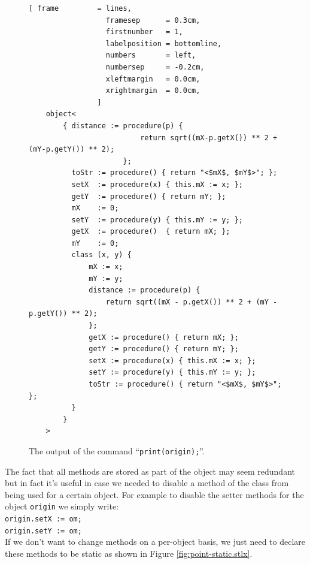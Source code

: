 \documentclass[11pt]{report}
\begin{document}
\begin{figure}[!ht]
\centering
\begin{Verbatim}[ frame         = lines, 
                  framesep      = 0.3cm, 
                  firstnumber   = 1,
                  labelposition = bottomline,
                  numbers       = left,
                  numbersep     = -0.2cm,
                  xleftmargin   = 0.0cm,
                  xrightmargin  = 0.0cm,
                ]
    object<
        { distance := procedure(p) { 
                          return sqrt((mX-p.getX()) ** 2 + (mY-p.getY()) ** 2); 
                      }; 
          toStr := procedure() { return "<$mX$, $mY$>"; }; 
          setX  := procedure(x) { this.mX := x; }; 
          getY  := procedure() { return mY; }; 
          mX    := 0; 
          setY  := procedure(y) { this.mY := y; }; 
          getX  := procedure()  { return mX; }; 
          mY    := 0; 
          class (x, y) { 
              mX := x; 
              mY := y; 
              distance := procedure(p) { 
                  return sqrt((mX - p.getX()) ** 2 + (mY - p.getY()) ** 2); 
              }; 
              getX := procedure() { return mX; };
              getY := procedure() { return mY; }; 
              setX := procedure(x) { this.mX := x; }; 
              setY := procedure(y) { this.mY := y; }; 
              toStr := procedure() { return "<$mX$, $mY$>"; }; 
          } 
        }
    >
\end{Verbatim}
\vspace*{-0.3cm}
\caption{The output of the command ``\texttt{print(origin);}''.}
\label{fig:print_origin}
\end{figure}

The fact that all methods are stored as part of the object may seem redundant but in fact it's useful in case we needed to disable a method of the class from being used for a certain object. For example to disable the setter methods for the object \texttt{origin} we simply write: 
\\[0.2cm]
\hspace*{1.3cm}
\texttt{origin.setX := om;}
\\
\hspace*{1.3cm}
\texttt{origin.setY := om;}
\\[0.2cm]

If we don't want to change methods on a per-object basis, we just need to declare these methods to be static as shown in Figure \ref{fig:point-static.stlx}.
\end{document}

